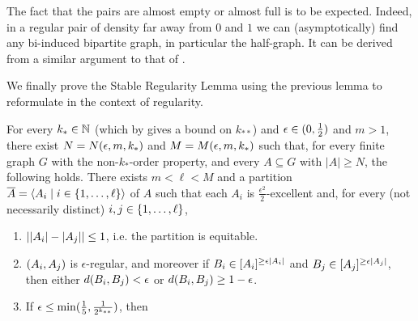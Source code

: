         \begin{remark}
            The fact that the pairs are almost empty or almost full is to be expected.
            Indeed, in a regular pair of density far away from $0$ and $1$ we can (asymptotically) find any bi-induced
            bipartite graph, in particular the half-graph.
            It can be derived from a similar argument to that of .
        \end{remark}

        We finally prove the Stable Regularity Lemma using the previous lemma to reformulate
         in the context of regularity.

        \begin{theorem} \label{thm:existance_of_regular_partitions}
            For every $k_* \in \mathbb{N}$ (which by  gives a bound on $k_{**}$) and
            $\epsilon \in ( 0, \frac{1}{2} )$ and $m > 1$, there exist $N = N( \epsilon, m, k_* )$
            and $M = M( \epsilon, m, k_* )$ such that, for every finite graph $G$ with the non-$k_{*}$-order property,
            and every $A \subseteq G$ with $|A| \geq N$, the following holds.
            There exists $m < \ell < M$ and a partition
            $\overline{A} = \left< A_i \mid i \in \{ 1, \dots, \ell \} \right>$ of $A$ such that each $A_i$ is
            $\frac{\epsilon^2}{2}$-excellent and, for every (not necessarily distinct) $i, j \in \{ 1, \dots, \ell \}$,
            \begin{enumerate}[label={\Roman*}., ref={\Roman*}, font=\rmfamily]
                \item \label{itm:existance_of_regular_partitions.1} $| | A_i |- | A_j | | \leq 1$,
                    i.e. the partition is equitable.
                \item \label{itm:existance_of_regular_partitions.2} $( A_i, A_j )$ is $\epsilon$-regular, and moreover if
                    $B_i \in [ A_i ]^{\geq \epsilon | A_i |}$ and $B_j \in [ A_j ]^{\geq \epsilon | A_j |}$,
                    then either $d( B_i, B_j ) < \epsilon$ or $d( B_i, B_j ) \geq 1 - \epsilon$.
                \item \label{itm:existance_of_regular_partitions.3} If $\epsilon \leq \min ( \frac{1}{5}, \frac{1}{2^{k_{**}}} )$, then

\end{enumerate}
\end{theorem}
